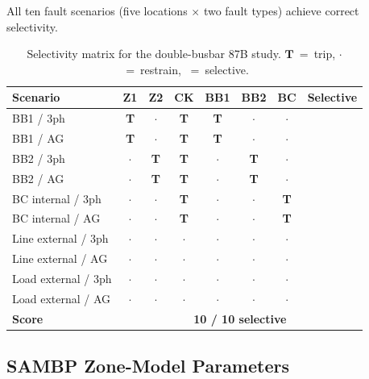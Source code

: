 \documentclass[12pt,a4paper]{article}
\newcommand{\cmark}{\ding{51}}
\begin{document}
All ten fault scenarios (five locations $\times$ two fault types)
achieve correct selectivity.

\begin{table}[H]
  \centering
  \caption{Selectivity matrix for the double-busbar 87B study.
           $\mathbf{T}$~=~trip, $\cdot$~=~restrain, \cmark~=~selective.}
  \label{tab:selectivity}
  \begin{tabular}{lccccccl}
    \toprule
    Scenario & Z1 & Z2 & CK & BB1 & BB2 & BC & Selective \\
    \midrule
    BB1 / 3ph          & \textbf{T} & $\cdot$ & \textbf{T} & \textbf{T} & $\cdot$ & $\cdot$ & \textcolor{okgreen}{\cmark} \\
    BB1 / AG           & \textbf{T} & $\cdot$ & \textbf{T} & \textbf{T} & $\cdot$ & $\cdot$ & \textcolor{okgreen}{\cmark} \\
    BB2 / 3ph          & $\cdot$ & \textbf{T} & \textbf{T} & $\cdot$ & \textbf{T} & $\cdot$ & \textcolor{okgreen}{\cmark} \\
    BB2 / AG           & $\cdot$ & \textbf{T} & \textbf{T} & $\cdot$ & \textbf{T} & $\cdot$ & \textcolor{okgreen}{\cmark} \\
    BC internal / 3ph  & $\cdot$ & $\cdot$ & \textbf{T} & $\cdot$ & $\cdot$ & \textbf{T} & \textcolor{okgreen}{\cmark} \\
    BC internal / AG   & $\cdot$ & $\cdot$ & \textbf{T} & $\cdot$ & $\cdot$ & \textbf{T} & \textcolor{okgreen}{\cmark} \\
    Line external / 3ph & $\cdot$ & $\cdot$ & $\cdot$ & $\cdot$ & $\cdot$ & $\cdot$ & \textcolor{okgreen}{\cmark} \\
    Line external / AG  & $\cdot$ & $\cdot$ & $\cdot$ & $\cdot$ & $\cdot$ & $\cdot$ & \textcolor{okgreen}{\cmark} \\
    Load external / 3ph & $\cdot$ & $\cdot$ & $\cdot$ & $\cdot$ & $\cdot$ & $\cdot$ & \textcolor{okgreen}{\cmark} \\
    Load external / AG  & $\cdot$ & $\cdot$ & $\cdot$ & $\cdot$ & $\cdot$ & $\cdot$ & \textcolor{okgreen}{\cmark} \\
    \midrule
    \textbf{Score} & \multicolumn{7}{c}{\textbf{10 / 10 selective}} \\
    \bottomrule
  \end{tabular}
\end{table}

\subsection{SAMBP Zone-Model Parameters}
\end{document}
